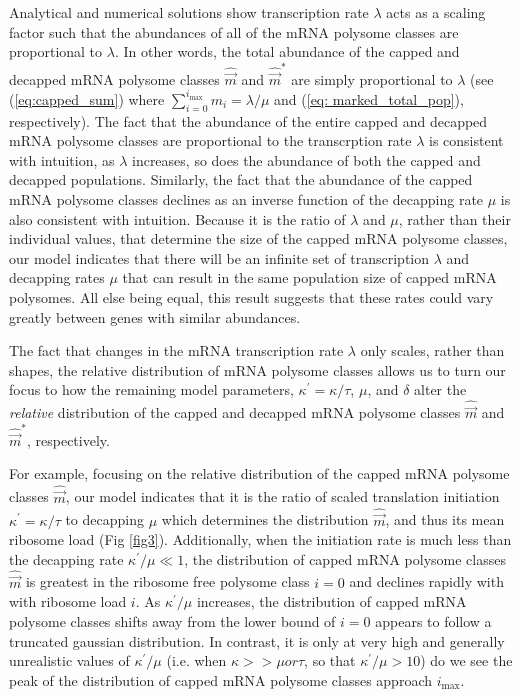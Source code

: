 \documentclass[10pt,letterpaper]{article}
\newcommand{\imax}{\ensuremath{{i_{\max}}}\xspace}
\newcommand{\kappaprime}{\ensuremath{\kappa^{\prime}}\xspace}
\newcommand{\mvec}{\ensuremath{\vec{m}}\xspace}
\newcommand{\mvechat}{\ensuremath{\hat{\mvec}}\xspace}
\newcommand{\mvechatstar}{\ensuremath{\mvechat^*}\xspace}
\begin{document}
Analytical and numerical solutions show transcription rate $\lambda$ acts as a scaling factor such that the abundances of all of the mRNA polysome classes are proportional to $\lambda$.
 In other words, the total abundance of the capped and decapped mRNA polysome classes $\mvechat$ and $\mvechatstar$ are simply proportional to $\lambda$ (see (\ref{eq:capped_sum}) where $\sum_{i = 0} ^\imax m_i = \lambda/\mu$ and (\ref{eq: marked_total_pop}), respectively).
  The fact that the abundance of the entire capped and decapped mRNA polysome classes are proportional to the transcrption rate $\lambda$ is consistent with intuition, as $\lambda$ increases, so does the abundance of both the capped and decapped populations.
  Similarly, the fact that the abundance of the capped mRNA polysome classes declines as an inverse function of the decapping rate $\mu$ is also consistent with intuition.
  Because it is the ratio of $\lambda$ and $\mu$, rather than their individual values, that determine the size of the capped mRNA polysome classes, our model indicates that there will be an infinite set of transcription $\lambda$ and decapping rates $\mu$ that can result in the same population size of capped mRNA polysomes.
  All else being equal, this result suggests that these rates could vary greatly between genes with similar abundances.


The fact that changes in the mRNA transcription rate  $\lambda$ only scales, rather than shapes, the relative distribution of mRNA polysome classes allows us to turn our focus to how the remaining model parameters, $\kappaprime = \kappa/\tau$, $\mu$, and $\delta$ alter the \emph{relative} distribution of the capped and decapped mRNA polysome classes \mvechat and \mvechatstar, respectively.

For example, focusing on the relative distribution of the capped mRNA polysome classes $\mvechat$, our model indicates that it is the ratio of scaled translation initiation $\kappaprime = \kappa/\tau$ to decapping $\mu$ which determines the distribution \mvechat, and thus its mean ribosome load  (Fig \ref{fig3}).
    Additionally, when the initiation rate is much less than the decapping rate $\kappaprime/\mu \ll 1$, the distribution of capped mRNA polysome classes $\mvechat$ is greatest in the ribosome free polysome class $i=0$ and declines rapidly with with ribosome load $i$.
    As $\kappaprime/\mu$ increases, the distribution of capped mRNA polysome classes shifts away from the lower bound of $i = 0$ appears to follow a truncated gaussian distribution.
    In contrast, it is only at very high and generally unrealistic values of $\kappaprime/\mu$ (i.e.  when $\kappa>>\mu or \tau$, so that $\kappaprime/\mu > 10$) do we see the peak of the distribution of capped mRNA polysome classes approach $\imax$.
\end{document}
